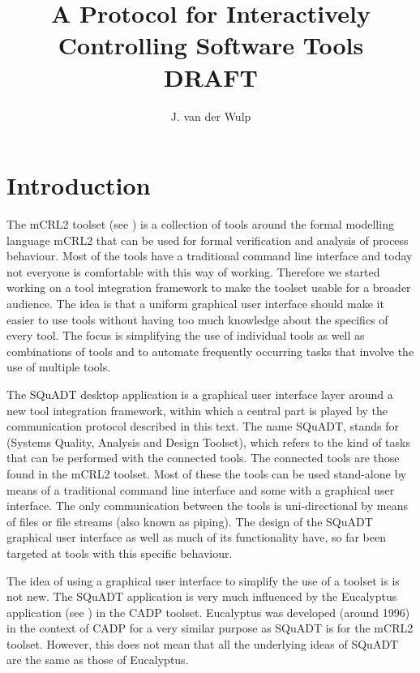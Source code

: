 \documentclass{article}
\title{A Protocol for Interactively Controlling Software Tools\\DRAFT}
\author{J. van der Wulp}
\newcommand{\squadt}{SQuADT\xspace}
\begin{document}
\maketitle
\thispagestyle{empty}

 \section{Introduction}

  The mCRL2 toolset (see \cite{groote_et_al:DSP:2007:862}) is a collection of
  tools around the formal modelling language mCRL2 that can be used for formal
  verification and analysis of process behaviour.  Most of the tools have a
  traditional command line interface and today not everyone is comfortable with
  this way of working.  Therefore we started working on a tool integration
  framework to make the toolset usable for a broader audience. The idea is that
  a uniform graphical user interface should make it easier to use tools without
  having too much knowledge about the specifics of every tool.  The focus is
  simplifying the use of individual tools as well as combinations of tools and
  to automate frequently occurring tasks that involve the use of multiple
  tools.
  
  The \squadt desktop application is a graphical user interface layer around a
  new tool integration framework, within which a central part is played by the
  communication protocol described in this text.  The name \squadt, stands for
  (Systems Quality, Analysis and Design Toolset), which refers to the kind of
  tasks that can be performed with the connected tools. The connected tools are
  those found in the mCRL2 toolset. Most of these the tools can be used
  stand-alone by means of a traditional command line interface and some with a
  graphical user interface.  The only communication between the tools is
  uni-directional by means of files or file streams (also known as piping). The
  design of the \squadt graphical user interface as well as much of its
  functionality have, so far been targeted at tools with this specific
  behaviour.
  
  The idea of using a graphical user interface to simplify the use of a toolset
  is is not new. The \squadt application is very much influenced by the
  Eucalyptus application (see \cite{CADP}) in the CADP toolset. Eucalyptus was
  developed (around 1996) in the context of CADP for a very similar purpose as
  \squadt is for the mCRL2 toolset. However, this does not mean that all the
  underlying ideas of \squadt are the same as those of Eucalyptus.
  
\end{document}
